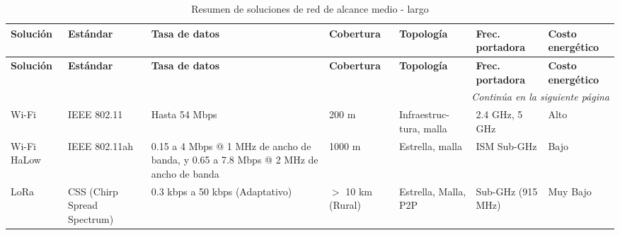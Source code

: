 \renewcommand{\arraystretch}{1.3}
\begin{longtable}{
    p{2cm}
    p{2.1cm}
    p{2cm}
    p{2.2cm}
    p{2cm}
    p{1.5cm}
    p{2.1cm}
}
\caption{Resumen de soluciones de red de alcance medio - largo \cite{lopez2023}}
\label{tab:redes_alcance_medio} \\
\toprule
\textbf{Solución} & 
\textbf{Estándar} & 
\textbf{Tasa de datos} & 
\textbf{Cobertura} & 
\textbf{Topología} & 
\textbf{Frec. portadora} & 
\textbf{Costo energético} \\
\midrule
\endfirsthead

\toprule
\textbf{Solución} & 
\textbf{Estándar} & 
\textbf{Tasa de datos} & 
\textbf{Cobertura} & 
\textbf{Topología} & 
\textbf{Frec. portadora} & 
\textbf{Costo energético} \\
\midrule
\endhead

\midrule
\multicolumn{7}{r}{\textit{Continúa en la siguiente página}} \\
\endfoot

\bottomrule
\endlastfoot

Wi-Fi 
& IEEE 802.11 
& Hasta 54 Mbps 
& 200 m 
& Infraestruc- tura, malla 
& 2.4 GHz, 5 GHz 
& Alto \\

Wi-Fi HaLow 
& IEEE 802.11ah 
& 0.15 a 4 Mbps @ 1 MHz de ancho de banda, y 0.65 a 7.8 Mbps @ 2 MHz de ancho de banda 
& 1000 m 
& Estrella, malla 
& ISM Sub-GHz 
& Bajo \\

LoRa 
& CSS (Chirp Spread Spectrum) 
& 0.3 kbps a 50 kbps (Adaptativo) 
& $>$ 10 km (Rural) 
& Estrella, Malla, P2P 
& Sub-GHz (915 MHz) 
& Muy Bajo \\ 
\end{longtable}

